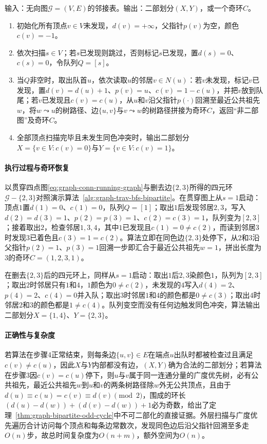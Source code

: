 \begin{algorithm}[基于BFS的二部图判定与奇环提取]
\label{alg:graph-trav-bfs-bipartite}
输入：无向图$\mathcal G=(V,E)$的邻接表。输出：二部划分$(X,Y)$，或一个奇环$C$。
\begin{enumerate}
  \item 初始化所有顶点$v\in V$未发现，$d(v)=+\infty$，父指针$p(v)$为空，颜色$c(v)=-1$。
  \item 依次扫描$s\in V$；若$s$已发现则跳过，否则标记$s$已发现，置$d(s)=0$、$c(s)=0$，令队列$Q=[s]$。
  \item 当$Q$非空时，取出队首$u$，依次读取$u$的邻居$v\in N(u)$：若$v$未发现，标记$v$已发现，置$d(v)=d(u)+1$、$p(v)=u$、$c(v)=1-c(u)$，并把$v$放到队尾；若$v$已发现且$c(v)=c(u)$，从$u$和$v$沿父指针$p(\cdot)$回溯至最近公共祖先$w$，将$w\leadsto u$的树路径、边$\{u,v\}$与$v\leadsto w$的树路径拼接为奇环$C$，返回“非二部图”及奇环$C$。
  \item 全部顶点扫描完毕且未发生同色冲突时，输出二部划分$X=\{v\in V:c(v)=0\}$与$Y=\{v\in V:c(v)=1\}$。
\end{enumerate}
\end{algorithm}

\paragraph{执行过程与奇环恢复}
以贯穿四点图\eqref{eq:graph-conn-running-graph}与删去边$\{2,3\}$所得的四元环$\mathcal G-\{2,3\}$对照演示算法~\ref{alg:graph-trav-bfs-bipartite}。在贯穿图上从$s=1$启动：顶点$1$置$d(1)=0$、$c(1)=0$，队列$Q=[1]$；取出$1$后发现邻居$2,3$，写入$d(2)=d(3)=1$、$p(2)=p(3)=1$、$c(2)=c(3)=1$，队列变为$[2,3]$；接着取出$2$，检查邻居$1,3,4$，其中$1$已发现且$c(1)=0\neq c(2)$，而读到邻居$3$时发现$3$已着色且$c(3)=1=c(2)$。算法立即在同色边$\{2,3\}$处停下，从$2$和$3$沿父指针$p(2)=1$、$p(3)=1$回溯一步即汇合于最近公共祖先$w=1$，拼出长度为$3$的奇环$C=(1,2,3,1)$。

在删去$\{2,3\}$后的四元环上，同样从$s=1$启动：取出$1$后$2,3$染颜色$1$，队列为$[2,3]$；取出$2$时邻居只有$1$和$4$，$1$颜色为$0\neq c(2)$，未发现的$4$写入$d(4)=2$、$p(4)=2$、$c(4)=0$并入队；取出$3$时邻居$1$和$4$的颜色都是$0\neq c(3)$；取出$4$时邻居$2$和$3$的颜色都是$1\neq c(4)$。队列变空而没有任何边触发同色冲突，算法输出二部划分$X=\{1,4\}$、$Y=\{2,3\}$。

\paragraph{正确性与复杂度}
若算法在步骤4正常结束，则每条边$\{u,v\}\in E$在端点$u$出队时都被检查过且满足$c(v)\neq c(u)$，因此$X$与$Y$内部都没有边，$(X,Y)$确为合法的二部划分；若算法在步骤3因$c(v)=c(u)$停下，则$u$与$v$属于同一连通分量的广度优先树，必有公共祖先，最近公共祖先$w$到$u$和$v$的两条树路径除$w$外无公共顶点，且由于$d(u)\equiv c(u)=c(v)\equiv d(v)\pmod 2$，围成的环长$(d(u)-d(w))+(d(v)-d(w))+1$必为奇数，给出了定理~\ref{thm:graph-bipartite-odd-cycle}中不可二部化的直接证据。外层扫描与广度优先遍历合计访问每个顶点和每条边常数次，发现同色边后沿父指针回溯至多走$O(n)$步，故总时间复杂度为$O(n+m)$，额外空间为$O(n)$。
